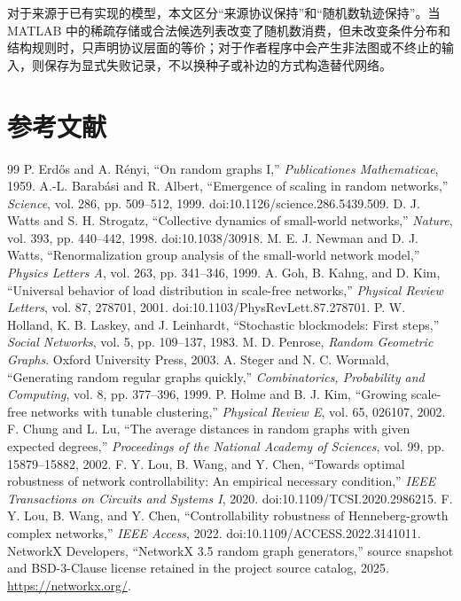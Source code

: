 \documentclass[UTF8,a4paper,11pt]{ctexart}
\begin{document}
对于来源于已有实现的模型，本文区分“来源协议保持”和“随机数轨迹保持”。当 MATLAB 中的稀疏存储或合法候选列表改变了随机数消费，但未改变条件分布和结构规则时，只声明协议层面的等价；对于作者程序中会产生非法图或不终止的输入，则保存为显式失败记录，不以换种子或补边的方式构造替代网络。

\section{参考文献}
\begin{thebibliography}{99}
 P. Erdős and A. Rényi, ``On random graphs I,'' \emph{Publicationes Mathematicae}, 1959.
 A.-L. Barabási and R. Albert, ``Emergence of scaling in random networks,'' \emph{Science}, vol. 286, pp. 509--512, 1999. doi:10.1126/science.286.5439.509.
 D. J. Watts and S. H. Strogatz, ``Collective dynamics of small-world networks,'' \emph{Nature}, vol. 393, pp. 440--442, 1998. doi:10.1038/30918.
 M. E. J. Newman and D. J. Watts, ``Renormalization group analysis of the small-world network model,'' \emph{Physics Letters A}, vol. 263, pp. 341--346, 1999.
 A. Goh, B. Kahng, and D. Kim, ``Universal behavior of load distribution in scale-free networks,'' \emph{Physical Review Letters}, vol. 87, 278701, 2001. doi:10.1103/PhysRevLett.87.278701.
 P. W. Holland, K. B. Laskey, and J. Leinhardt, ``Stochastic blockmodels: First steps,'' \emph{Social Networks}, vol. 5, pp. 109--137, 1983.
 M. D. Penrose, \emph{Random Geometric Graphs}. Oxford University Press, 2003.
 A. Steger and N. C. Wormald, ``Generating random regular graphs quickly,'' \emph{Combinatorics, Probability and Computing}, vol. 8, pp. 377--396, 1999.
 P. Holme and B. J. Kim, ``Growing scale-free networks with tunable clustering,'' \emph{Physical Review E}, vol. 65, 026107, 2002.
 F. Chung and L. Lu, ``The average distances in random graphs with given expected degrees,'' \emph{Proceedings of the National Academy of Sciences}, vol. 99, pp. 15879--15882, 2002.
 F. Y. Lou, B. Wang, and Y. Chen, ``Towards optimal robustness of network controllability: An empirical necessary condition,'' \emph{IEEE Transactions on Circuits and Systems I}, 2020. doi:10.1109/TCSI.2020.2986215.
 F. Y. Lou, B. Wang, and Y. Chen, ``Controllability robustness of Henneberg-growth complex networks,'' \emph{IEEE Access}, 2022. doi:10.1109/ACCESS.2022.3141011.
 NetworkX Developers, ``NetworkX 3.5 random graph generators,'' source snapshot and BSD-3-Clause license retained in the project source catalog, 2025. \url{https://networkx.org/}.
\end{thebibliography}
\end{document}
